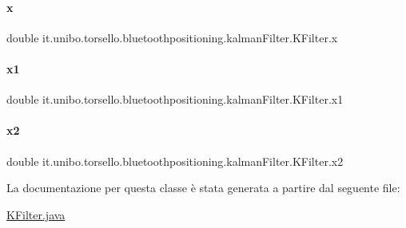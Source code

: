 \paragraph{\texorpdfstring{x}{x}}
{\footnotesize\ttfamily double it.\+unibo.\+torsello.\+bluetoothpositioning.\+kalman\+Filter.\+K\+Filter.\+x\hspace{0.3cm}{\ttfamily [private]}}

\hypertarget{classit_1_1unibo_1_1torsello_1_1bluetoothpositioning_1_1kalmanFilter_1_1KFilter_ac6a114b47e572ccdfb7b1df2aa77c190_ac6a114b47e572ccdfb7b1df2aa77c190}{}\label{classit_1_1unibo_1_1torsello_1_1bluetoothpositioning_1_1kalmanFilter_1_1KFilter_ac6a114b47e572ccdfb7b1df2aa77c190_ac6a114b47e572ccdfb7b1df2aa77c190} 
\paragraph{\texorpdfstring{x1}{x1}}
{\footnotesize\ttfamily double it.\+unibo.\+torsello.\+bluetoothpositioning.\+kalman\+Filter.\+K\+Filter.\+x1\hspace{0.3cm}{\ttfamily [private]}}

\hypertarget{classit_1_1unibo_1_1torsello_1_1bluetoothpositioning_1_1kalmanFilter_1_1KFilter_a45faa12a35825dd4bd104e1cbeeaf609_a45faa12a35825dd4bd104e1cbeeaf609}{}\label{classit_1_1unibo_1_1torsello_1_1bluetoothpositioning_1_1kalmanFilter_1_1KFilter_a45faa12a35825dd4bd104e1cbeeaf609_a45faa12a35825dd4bd104e1cbeeaf609} 
\paragraph{\texorpdfstring{x2}{x2}}
{\footnotesize\ttfamily double it.\+unibo.\+torsello.\+bluetoothpositioning.\+kalman\+Filter.\+K\+Filter.\+x2\hspace{0.3cm}{\ttfamily [private]}}



La documentazione per questa classe è stata generata a partire dal seguente file\+:\begin{DoxyCompactItemize}
\item 
\hyperlink{KFilter_8java}{K\+Filter.\+java}\end{DoxyCompactItemize}
